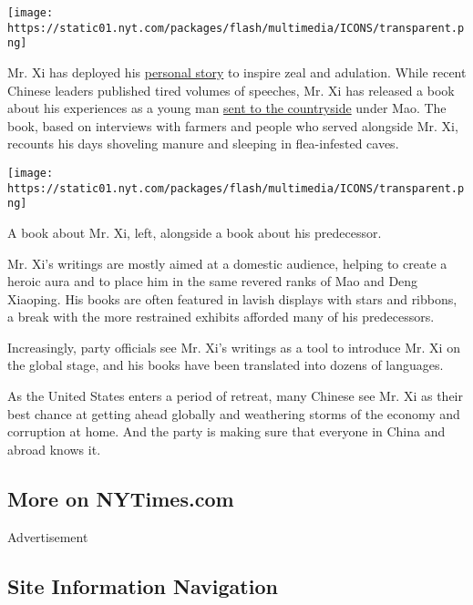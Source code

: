 \texttt{[image: https://static01.nyt.com/packages/flash/multimedia/ICONS/transparent.png]}

Mr. Xi has deployed his
\href{https://www.nytimes.com/2017/10/08/world/asia/xi-jinping-china-propaganda-village.html}{personal
story} to inspire zeal and adulation. While recent Chinese leaders
published tired volumes of speeches, Mr. Xi has released a book about
his experiences as a young man
\href{https://www.nytimes.com/2017/10/08/world/asia/xi-jinping-china-propaganda-village.html?_r=0}{sent
to the countryside} under Mao. The book, based on interviews with
farmers and people who served alongside Mr. Xi, recounts his days
shoveling manure and sleeping in flea-infested caves.

\texttt{[image: https://static01.nyt.com/packages/flash/multimedia/ICONS/transparent.png]}

A book about Mr. Xi, left, alongside a book about his predecessor.

Mr. Xi's writings are mostly aimed at a domestic audience, helping to
create a heroic aura and to place him in the same revered ranks of Mao
and Deng Xiaoping. His books are often featured in lavish displays with
stars and ribbons, a break with the more restrained exhibits afforded
many of his predecessors.

Increasingly, party officials see Mr. Xi's writings as a tool to
introduce Mr. Xi on the global stage, and his books have been translated
into dozens of languages.

As the United States enters a period of retreat, many Chinese see Mr. Xi
as their best chance at getting ahead globally and weathering storms of
the economy and corruption at home. And the party is making sure that
everyone in China and abroad knows it.

\hypertarget{more-on-nytimescom}{%
\subsection{More on NYTimes.com}\label{more-on-nytimescom}}

Advertisement

\hypertarget{site-information-navigation}{%
\subsection{Site Information
Navigation}\label{site-information-navigation}}

